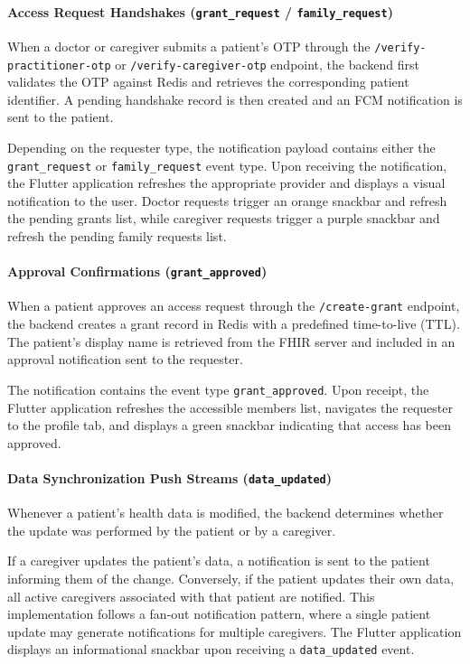 \paragraph{Access Request Handshakes (\texttt{grant\_request} / \texttt{family\_request})}
When a doctor or caregiver submits a patient's OTP through the \texttt{/verify-practitioner-otp} or \texttt{/verify-caregiver-otp} endpoint, the backend first validates the OTP against Redis and retrieves the corresponding patient identifier. A pending handshake record is then created and an FCM notification is sent to the patient.

Depending on the requester type, the notification payload contains either the \texttt{grant\_request} or \texttt{family\_request} event type. Upon receiving the notification, the Flutter application refreshes the appropriate provider and displays a visual notification to the user. Doctor requests trigger an orange snackbar and refresh the pending grants list, while caregiver requests trigger a purple snackbar and refresh the pending family requests list.

\paragraph{Approval Confirmations (\texttt{grant\_approved})}
When a patient approves an access request through the \texttt{/create-grant} endpoint, the backend creates a grant record in Redis with a predefined time-to-live (TTL). The patient's display name is retrieved from the FHIR server and included in an approval notification sent to the requester.

The notification contains the event type \texttt{grant\_approved}. Upon receipt, the Flutter application refreshes the accessible members list, navigates the requester to the profile tab, and displays a green snackbar indicating that access has been approved.

\paragraph{Data Synchronization Push Streams (\texttt{data\_updated})}
Whenever a patient's health data is modified, the backend determines whether the update was performed by the patient or by a caregiver.

If a caregiver updates the patient's data, a notification is sent to the patient informing them of the change. Conversely, if the patient updates their own data, all active caregivers associated with that patient are notified. This implementation follows a fan-out notification pattern, where a single patient update may generate notifications for multiple caregivers. The Flutter application displays an informational snackbar upon receiving a \texttt{data\_updated} event.

